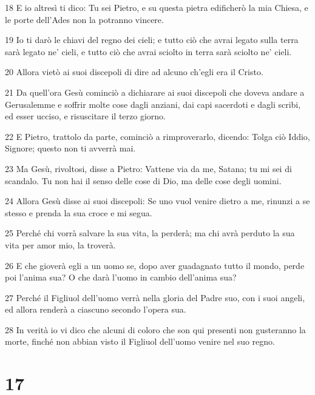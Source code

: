 \par 18 E io altresì ti dico: Tu sei Pietro, e su questa pietra edificherò la mia Chiesa, e le porte dell'Ades non la potranno vincere.
\par 19 Io ti darò le chiavi del regno dei cieli; e tutto ciò che avrai legato sulla terra sarà legato ne' cieli, e tutto ciò che avrai sciolto in terra sarà sciolto ne' cieli.
\par 20 Allora vietò ai suoi discepoli di dire ad alcuno ch'egli era il Cristo.
\par 21 Da quell'ora Gesù cominciò a dichiarare ai suoi discepoli che doveva andare a Gerusalemme e soffrir molte cose dagli anziani, dai capi sacerdoti e dagli scribi, ed esser ucciso, e risuscitare il terzo giorno.
\par 22 E Pietro, trattolo da parte, cominciò a rimproverarlo, dicendo: Tolga ciò Iddio, Signore; questo non ti avverrà mai.
\par 23 Ma Gesù, rivoltosi, disse a Pietro: Vattene via da me, Satana; tu mi sei di scandalo. Tu non hai il senso delle cose di Dio, ma delle cose degli uomini.
\par 24 Allora Gesù disse ai suoi discepoli: Se uno vuol venire dietro a me, rinunzi a se stesso e prenda la sua croce e mi segua.
\par 25 Perché chi vorrà salvare la sua vita, la perderà; ma chi avrà perduto la sua vita per amor mio, la troverà.
\par 26 E che gioverà egli a un uomo se, dopo aver guadagnato tutto il mondo, perde poi l'anima sua? O che darà l'uomo in cambio dell'anima sua?
\par 27 Perché il Figliuol dell'uomo verrà nella gloria del Padre suo, con i suoi angeli, ed allora renderà a ciascuno secondo l'opera sua.
\par 28 In verità io vi dico che alcuni di coloro che son qui presenti non gusteranno la morte, finché non abbian visto il Figliuol dell'uomo venire nel suo regno.

\chapter{17}

